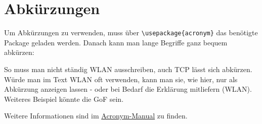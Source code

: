 
\section{Abkürzungen}

Um Abkürzungen zu verwenden, muss über \lstinline|\usepackage{acronym}| das benötigte Package geladen werden. Danach kann man lange Begriffe ganz bequem abkürzen:

So muss man nicht ständig \ac{WLAN} ausschreiben, auch \ac{TCP} lässt sich abkürzen. Würde man im Text \acs{WLAN} oft verwenden, kann man sie, wie hier, nur als
Abkürzung anzeigen lassen - oder bei Bedarf die Erklärung mitliefern (\acf{WLAN}). Weiteres Beispiel könnte die \ac{GoF} sein.

Weitere Informationen sind im \href{http://www.ctan.org/tex-archive/macros/latex/contrib/acronym}{Acronym-Manual} zu finden.